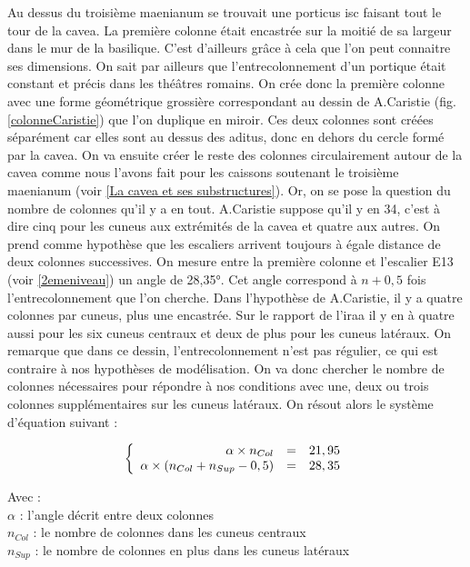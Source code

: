 Au dessus du troisième \gls{maenianum} se trouvait une \gls{porticus isc} faisant tout le tour de la \gls{cavea}. La première colonne était encastrée sur la moitié de sa largeur dans le mur de la basilique. C'est d'ailleurs grâce à cela que l'on peut connaitre ses dimensions. On sait par ailleurs que l'entrecolonnement d'un portique était constant et précis dans les théâtres romains. On crée donc la première colonne avec une forme géométrique grossière correspondant au dessin de A.Caristie (fig. \ref{colonneCaristie}) que l'on duplique en miroir. Ces deux colonnes sont créées séparément car elles sont au dessus des \gls{aditus}, donc en dehors du cercle formé par la \gls{cavea}. On va ensuite créer le reste des colonnes circulairement autour de la \gls{cavea} comme nous l'avons fait pour les caissons soutenant le troisième \gls{maenianum} (voir \ref{La cavea et ses substructures}). Or, on se pose la question du nombre de colonnes qu'il y a en tout. A.Caristie suppose qu'il y en 34, c'est à dire cinq pour les \gls{cuneus} aux extrémités de la \gls{cavea} et quatre aux autres. On prend comme hypothèse que les escaliers arrivent toujours à égale distance de deux colonnes successives. On mesure entre la première colonne et l'escalier E13 (voir \ref{2emeniveau}) un angle de 28,35°. Cet angle correspond à $n+0,5$ fois l'entrecolonnement que l'on cherche. Dans l'hypothèse de A.Caristie, il y a quatre colonnes par \gls{cuneus}, plus une encastrée. Sur le rapport de l'\gls{iraa} \cite[Pl. XX]{orangePl} il y en à quatre aussi pour les six \gls{cuneus} centraux et deux de plus pour les \gls{cuneus} latéraux. On remarque que dans ce dessin, l'entrecolonnement n'est pas régulier, ce qui est contraire à nos hypothèses de modélisation. On va donc chercher le nombre de colonnes nécessaires pour répondre à nos conditions avec une, deux ou trois colonnes supplémentaires sur les \gls{cuneus} latéraux. On résout alors le système d'équation suivant :


\begin{equation}
  \left \{
   \begin{array}{r c l}
      \alpha \times n_{Col}  & = & 21,95 \\
      \alpha \times (n_{Col} + n_{Sup} - 0,5)   & = &  28,35
   \end{array}
   \right .
\end{equation}

Avec : \\
$\alpha$ : l'angle décrit entre deux colonnes \\
$n_{Col}$ : le nombre de colonnes dans les cuneus centraux \\
$n_{Sup}$ : le nombre de colonnes en plus dans les cuneus latéraux \\

